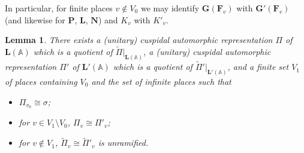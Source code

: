 \documentclass[a4paper]{amsart}
\numberwithin{equation}{section}
\newtheorem{lem}[thm]{Lemma}
\theoremstyle{remark}
\theoremstyle{definition}
\newcommand{\glob}[1]{\boldsymbol{#1}}
\renewcommand{\simeq}{\cong}
\begin{document}
In particular, for finite places $v \notin V_0$ we may identify $\glob{G}(\glob{F}_{v})$ with $\glob{G}'(\glob{F}_{v})$ (and likewise for $\glob{P}$, $\glob{L}$, $\glob{N}$)
and $K_v$ with $K'_v$.

\begin{lem}\label{lem:density argument}
There exists a (unitary) cuspidal automorphic representation $\Pi$ of $\glob{L}(\mathbb{A})$ which is a quotient of $\widetilde{\Pi}|_{\glob{L}(\mathbb{A})}$, a (unitary) cuspidal automorphic representation $\Pi'$ of $\glob{L}'(\mathbb{A})$ which is a quotient of $\widetilde{\Pi}'|_{\glob{L}'(\mathbb{A})}$, and a finite set $V_{1}$ of places containing $V_{0}$ and the set of infinite places such that
\begin{itemize}
\item $\Pi_{v_{0}}\simeq \sigma$;
\item for $v\in V_{1}\setminus V_{0}$, $\Pi_{v}\simeq \Pi'_{v}$;
\item for $v\notin V_{1}$, $\widetilde{\Pi}_{v} \simeq \widetilde{\Pi}'_{v}$ is unramified.
\end{itemize}
\end{lem}
\end{document}
